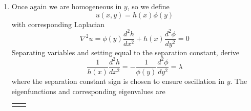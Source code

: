 \documentclass[a4paper]{article}
\begin{document}
\begin{enumerate}[label=(\alph*)]
\begin{center}
		\begin{tabular}{|c||c|}
			\hline
			\rule[-1.2em]{0pt}{3em}
			 & \( \displaystyle{\lambda = \!\left( \frac{n \pi}{H} \right)^{2} > 0} \) \\
			\hline\hline
			\rule[-1.2em]{0pt}{3em}
			\( \phi \!\left( y \right) \) & \( \displaystyle{\sin\!\left(\frac{n \pi y}{H}\right)} \) \\	
			\hline
			\rule[-1.2em]{0pt}{3em}
			\( h \!\left( x \right) \) & \( \displaystyle{\sinh\!\left(\frac{n \pi}{H}\!\left( x - L \right)\right)} \) \\
			\hline
		\end{tabular}
	\end{center}
	By superposition, we have temperature distribution
	\[
		u \!\left( x,y \right) = \sum^{\infty}_{n=1} A_{n}\sin\!\left(\frac{n \pi y}{H}\right)\sinh\!\left(\frac{n \pi}{H}\!\left( x - L \right)\right) 
	\]
	To derive the coefficients \( A_{n} \), first differentiate with respect to \( x \) and examine the point \( \!\left( 0,y \right) \), where the non-homogeneous condition is realized
	\[
		\frac{\partial u}{\partial x}\!\left( 0,y \right) = \sum^{\infty}_{n=1} A_{n}\!\left( \frac{n \pi}{H} \right)\sin\!\left(\frac{n \pi y}{H}\right)\cosh\!\left(-\frac{n \pi L}{H}\right) = g \!\left( y \right) 
	\]
	Then multiplying the right equality by \( \sin\!\left(m \pi y / H\right) \), integrating from \( 0 \) to \( H \), and isolating the coefficient produces
	\[
		A_{m} = \frac{2}{m \pi \cosh\!\left(m \pi L / H\right)}\int^{H}_{0} g \!\left( y \right)\sin\!\left(\frac{m \pi y}{H}\right) \, dy  
	\]
	where we appeal to the evenness of the hyperbolic cosine function to change the argument sign to positive.
	\item Once again we are homogeneous in \( y \), so we define
	\[
		u \!\left( x,y \right) = h \!\left( x \right)\phi \!\left( y \right) 
	\]
	with corresponding Laplacian
	\[
		\nabla^{2}u = \phi \!\left( y \right)\frac{d^2 h}{d x^2} + h \!\left( x \right)\frac{d^2 \phi}{d y^2} = 0 
	\]
	Separating variables and setting equal to the separation constant, derive
	\[
		\frac{1}{h \!\left( x \right)}\frac{d^2 h}{d x^2} = -\frac{1}{\phi \!\left( y \right)}\frac{d^2 \phi}{d y^2} = \lambda 
	\]
	where the separation constant sign is chosen to ensure oscillation in \( y \). The eigenfunctions and corresponding eigenvalues are
	\begin{center}
		\renewcommand{\arraystretch}{1.8}
		\setlength{\arraycolsep}{10pt}
		\begin{tabular}{|c||c|}
			\hline
			\rule[-1.2em]{0pt}{3em}

\end{tabular}
\end{center}
\end{enumerate}
\end{document}
